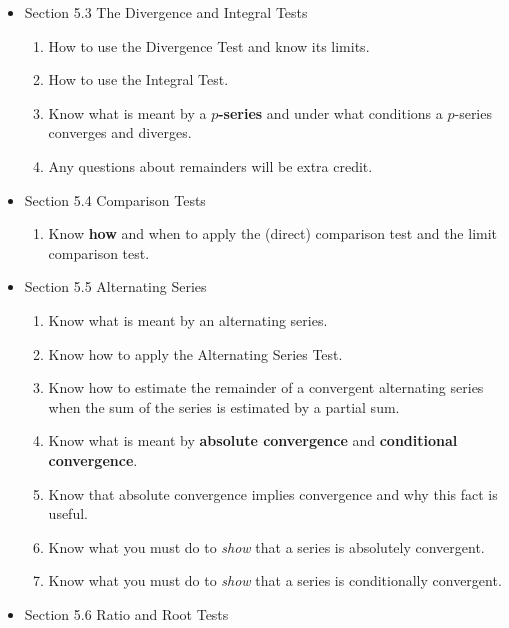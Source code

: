 \documentclass[11pt,fleqn]{article}
\begin{document}
\begin{itemize}
\item Section 5.3 The Divergence and Integral Tests\\

	\begin{enumerate}
	\item How to use the Divergence Test and know its limits.
	\item How to use the Integral Test.
	\item Know what is meant by a \textbf{$p$-series} and under what conditions a $p$-series converges and diverges.
	\item Any questions about remainders will be extra credit.
	\end{enumerate}

\item Section 5.4 Comparison Tests\\

	\begin{enumerate}
	\item Know \textbf{how} and when to apply the (direct) comparison test and the limit comparison test.\\
	\end{enumerate}

\item Section 5.5 Alternating Series \\

	\begin{enumerate}
	\item Know what is meant by an alternating series.
	\item Know how to apply the Alternating Series Test.
	\item Know how to estimate the remainder of a convergent alternating series when the sum of the series is estimated by a partial sum.
	\item Know what is meant by \textbf{absolute convergence} and \textbf{conditional convergence}.
	\item Know that absolute convergence implies convergence and why this fact is useful.
	\item Know what you must do to \emph{show} that a series is absolutely convergent.
	\item Know what you must do to \emph{show} that a series is conditionally convergent.\\
	\end{enumerate}

\item Section 5.6 Ratio and Root Tests\\


\end{itemize}
\end{document}
